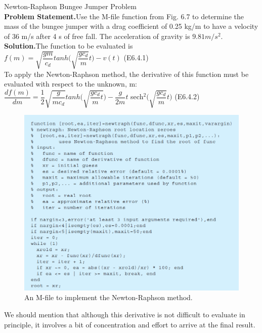 \documentclass[../main.tex]{subfiles}
\begin{document}
\begin{example} Newton-Raphson Bungee Jumper Problem\\

    \noindent\textbf{Problem Statement.}\quad Use the M-file function from Fig. 6.7 to determine the mass of the
    bungee jumper with a drag coefficient of 0.25 kg/m to have a velocity of 36 m/s after 4 s of
    free fall. The acceleration of gravity is $9.81 m/s^2$.\\

    \noindent\textbf{Solution.}\quad The function to be evaluated is\\

    $f(m)=\sqrt{\dfrac{gm}{c_d}}tanh\Big(\sqrt{\dfrac{gc_d}{m}}t \Big)-v(t)$
    \hfill (E6.4.1)\\

    To apply the Newton-Raphson method, the derivative of this function must be evaluated
    with respect to the unknown, m:\\

    $\dfrac{df(m)}{dm} = \dfrac{1}{2}\sqrt{\dfrac{g}{mc_d}}tanh\Big(\sqrt{\dfrac{gc_d}{m}t} \Big)
    -\dfrac{g}{2m}t$ sech$^2\Big(\sqrt{\dfrac{gc_d}{m}}t \Big)$
    \hfill (E6.4.2)\\

    \begin{figure}[h]
        \includegraphics[width=0.8\linewidth]{./images/fig_6_7}
        \caption{An M-file to implement the Newton-Raphson method.}
    \end{figure}

    \noindent We should mention that although this derivative is not difficult to evaluate in principle, it
    involves a bit of concentration and effort to arrive at the final result.
    

\end{example}
\end{document}
